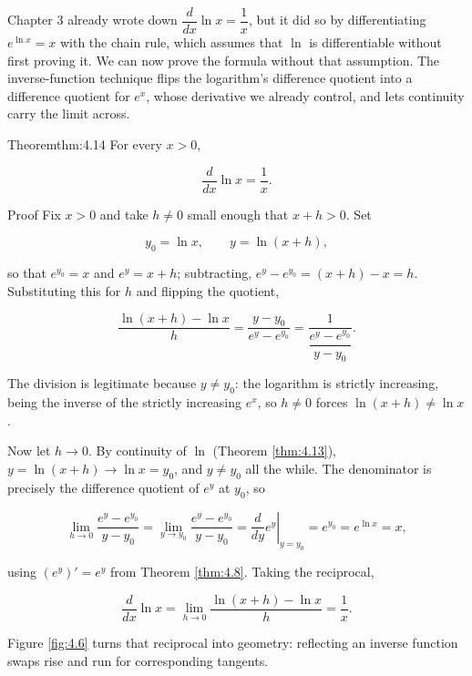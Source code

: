 \documentclass[a4paper,12pt,oneside]{memoir}
\begin{document}
Chapter 3 already wrote down \(\dfrac{d}{dx}\ln x = \dfrac{1}{x}\), but it did so by differentiating \(e^{\ln x} = x\) with the chain rule, which assumes that \(\ln\) is differentiable without first proving it. We can now prove the formula without that assumption. The inverse-function technique flips the logarithm’s difference quotient into a difference quotient for \(e^{x}\), whose derivative we already control, and lets continuity carry the limit across.

\begin{envtheorem}{Theorem}{thm:4.14}{}
For every \(x > 0\),

\[ \frac{d}{dx}\ln x = \frac{1}{x}. \]
\end{envtheorem}
\begin{envproof}{Proof}{}{}
Fix \(x > 0\) and take \(h \ne 0\) small enough that \(x + h > 0\). Set

\[ y_{0} = \ln x, \qquad y = \ln(x + h), \]

so that \(e^{y_{0}} = x\) and \(e^{y} = x + h\); subtracting, \(e^{y} - e^{y_{0}} = (x + h) - x = h\). Substituting this for \(h\) and flipping the quotient,

\[ \frac{\ln(x + h) - \ln x}{h} = \frac{y - y_{0}}{e^{y} - e^{y_{0}}} = \frac{1}{\dfrac{e^{y} - e^{y_{0}}}{y - y_{0}}}. \]

The division is legitimate because \(y \ne y_{0}\): the logarithm is strictly increasing, being the inverse of the strictly increasing \(e^{x}\), so \(h \ne 0\) forces \(\ln(x + h) \ne \ln x\).

Now let \(h \to 0\). By continuity of \(\ln\) (Theorem \ref{thm:4.13}), \(y = \ln(x + h) \to \ln x = y_{0}\), and \(y \ne y_{0}\) all the while. The denominator is precisely the difference quotient of \(e^{y}\) at \(y_{0}\), so

\[ \lim_{h \to 0} \frac{e^{y} - e^{y_{0}}}{y - y_{0}} = \lim_{y \to y_{0}} \frac{e^{y} - e^{y_{0}}}{y - y_{0}} = \left.\frac{d}{dy} e^{y}\right|_{y = y_{0}} = e^{y_{0}} = e^{\ln x} = x, \]

using \((e^{y})' = e^{y}\) from Theorem \ref{thm:4.8}. Taking the reciprocal,

\[ \frac{d}{dx}\ln x = \lim_{h \to 0} \frac{\ln(x + h) - \ln x}{h} = \frac{1}{x}. \]

\qedmark
\end{envproof}
Figure \ref{fig:4.6} turns that reciprocal into geometry: reflecting an inverse function swaps rise and run for corresponding tangents.
\end{document}
